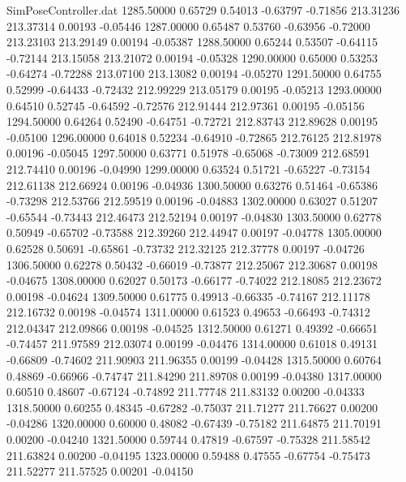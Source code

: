 \begin{filecontents}{SimPoseController.dat}
1285.50000    0.65729    0.54013    -0.63797   -0.71856  213.31236  213.37314    0.00193   -0.05446
1287.00000    0.65487    0.53760    -0.63956   -0.72000  213.23103  213.29149    0.00194   -0.05387
1288.50000    0.65244    0.53507    -0.64115   -0.72144  213.15058  213.21072    0.00194   -0.05328
1290.00000    0.65000    0.53253    -0.64274   -0.72288  213.07100  213.13082    0.00194   -0.05270
1291.50000    0.64755    0.52999    -0.64433   -0.72432  212.99229  213.05179    0.00195   -0.05213
1293.00000    0.64510    0.52745    -0.64592   -0.72576  212.91444  212.97361    0.00195   -0.05156
1294.50000    0.64264    0.52490    -0.64751   -0.72721  212.83743  212.89628    0.00195   -0.05100
1296.00000    0.64018    0.52234    -0.64910   -0.72865  212.76125  212.81978    0.00196   -0.05045
1297.50000    0.63771    0.51978    -0.65068   -0.73009  212.68591  212.74410    0.00196   -0.04990
1299.00000    0.63524    0.51721    -0.65227   -0.73154  212.61138  212.66924    0.00196   -0.04936
1300.50000    0.63276    0.51464    -0.65386   -0.73298  212.53766  212.59519    0.00196   -0.04883
1302.00000    0.63027    0.51207    -0.65544   -0.73443  212.46473  212.52194    0.00197   -0.04830
1303.50000    0.62778    0.50949    -0.65702   -0.73588  212.39260  212.44947    0.00197   -0.04778
1305.00000    0.62528    0.50691    -0.65861   -0.73732  212.32125  212.37778    0.00197   -0.04726
1306.50000    0.62278    0.50432    -0.66019   -0.73877  212.25067  212.30687    0.00198   -0.04675
1308.00000    0.62027    0.50173    -0.66177   -0.74022  212.18085  212.23672    0.00198   -0.04624
1309.50000    0.61775    0.49913    -0.66335   -0.74167  212.11178  212.16732    0.00198   -0.04574
1311.00000    0.61523    0.49653    -0.66493   -0.74312  212.04347  212.09866    0.00198   -0.04525
1312.50000    0.61271    0.49392    -0.66651   -0.74457  211.97589  212.03074    0.00199   -0.04476
1314.00000    0.61018    0.49131    -0.66809   -0.74602  211.90903  211.96355    0.00199   -0.04428
1315.50000    0.60764    0.48869    -0.66966   -0.74747  211.84290  211.89708    0.00199   -0.04380
1317.00000    0.60510    0.48607    -0.67124   -0.74892  211.77748  211.83132    0.00200   -0.04333
1318.50000    0.60255    0.48345    -0.67282   -0.75037  211.71277  211.76627    0.00200   -0.04286
1320.00000    0.60000    0.48082    -0.67439   -0.75182  211.64875  211.70191    0.00200   -0.04240
1321.50000    0.59744    0.47819    -0.67597   -0.75328  211.58542  211.63824    0.00200   -0.04195
1323.00000    0.59488    0.47555    -0.67754   -0.75473  211.52277  211.57525    0.00201   -0.04150

\end{filecontents}
